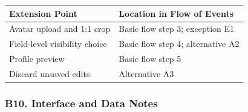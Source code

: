 \documentclass[12pt]{article}
\renewcommand{\baselinestretch}{1.5}
\begin{document}
\begingroup
\small
\renewcommand{\baselinestretch}{1.0}\selectfont
\renewcommand{\arraystretch}{1.15}
\setlength{\tabcolsep}{6pt}
\begin{longtable}{|>{\raggedright\arraybackslash}p{}|>{\raggedright\arraybackslash}p{}|}
\hline
\textbf{Extension Point} & \textbf{Location in Flow of Events} \\ \hline
\endhead
Avatar upload and 1:1 crop & Basic flow step 3; exception E1 \\ \hline
Field-level visibility choice & Basic flow step 4; alternative A2 \\ \hline
Profile preview & Basic flow step 5 \\ \hline
Discard unsaved edits & Alternative A3 \\ \hline
\end{longtable}
\endgroup
\par\medskip

\hypertarget{sec:b10-interface-and-data-notes}{}
\subsubsection*{B10. Interface and Data Notes}
\par\medskip
\end{document}
